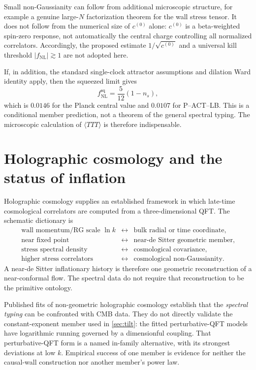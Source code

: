 \documentclass[11pt]{article}
\numberwithin{equation}{section}
\newcommand{\cz}{c^{(0)}}
\theoremstyle{definition}
\theoremstyle{remark}
\begin{document}
Small non-Gaussianity can follow from additional microscopic structure, for example a genuine large-$N$ factorization theorem for the wall stress tensor. It does not follow from the numerical size of $\cz$ alone: $\cz$ is a beta-weighted spin-zero response, not automatically the central charge controlling all normalized correlators. Accordingly, the proposed estimate $1/\sqrt{\cz}$ and a universal kill threshold $|f_{\mathrm{NL}}|\gtrsim1$ are not adopted here.

If, in addition, the standard single-clock attractor assumptions and dilation Ward identity apply, then the squeezed limit gives
\begin{equation}
\boxed{f_{\mathrm{NL}}^{\mathrm{sq}}=\frac5{12}(1-n_s),}
\end{equation}
which is $0.0146$ for the Planck central value and $0.0107$ for P--ACT--LB. This is a conditional member prediction, not a theorem of the general spectral typing. The microscopic calculation of $\langle TTT\rangle$ is therefore indispensable.

\section{Holographic cosmology and the status of inflation}
\label{sec:holography}

Holographic cosmology supplies an established framework in which late-time cosmological correlators are computed from a three-dimensional QFT. The schematic dictionary is
\begin{equation}
\begin{array}{ccl}
\text{wall momentum/RG scale }\ln k&\leftrightarrow&\text{bulk radial or time coordinate},\\
\text{near fixed point}&\leftrightarrow&\text{near-de Sitter geometric member},\\
\text{stress spectral density}&\leftrightarrow&\text{cosmological covariance},\\
\text{higher stress correlators}&\leftrightarrow&\text{cosmological non-Gaussianity}.
\end{array}
\end{equation}
A near-de Sitter inflationary history is therefore one geometric reconstruction of a near-conformal flow. The spectral data do not require that reconstruction to be the primitive ontology.

Published fits of non-geometric holographic cosmology establish that the \emph{spectral typing} can be confronted with CMB data. They do not directly validate the constant-exponent member used in \cref{sec:tilt}: the fitted perturbative-QFT models have logarithmic running governed by a dimensionful coupling. That perturbative-QFT form is a named in-family alternative, with its strongest deviations at low $k$. Empirical success of one member is evidence for neither the causal-wall construction nor another member's power law.
\end{document}
